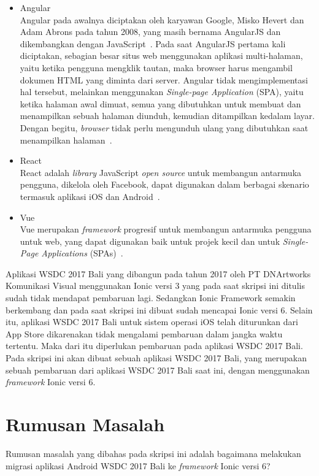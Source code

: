 \begin{itemize}
	\item Angular \\
	Angular pada awalnya diciptakan oleh karyawan Google, Misko Hevert dan Adam Abrons pada tahun 2008, yang masih bernama AngularJS dan dikembangkan dengan JavaScript~\cite{wohlgethan:18:supporting}. Pada saat AngularJS pertama kali diciptakan, sebagian besar situs web menggunakan aplikasi multi-halaman, yaitu ketika pengguna mengklik tautan, maka browser harus mengambil dokumen HTML yang diminta dari server. Angular tidak mengimplementasi hal tersebut, melainkan menggunakan \textit{Single-page Application} (SPA), yaitu ketika halaman awal dimuat, semua yang dibutuhkan untuk membuat dan menampilkan sebuah halaman diunduh, kemudian ditampilkan kedalam layar. Dengan begitu, \textit{browser} tidak perlu  mengunduh ulang yang dibutuhkan saat menampilkan halaman~\cite{scott:15:spa}.
	
	\item React \\
	React adalah \textit{library} JavaScript {\it open source} untuk membangun antarmuka pengguna, dikelola oleh Facebook, dapat digunakan dalam berbagai skenario termasuk aplikasi iOS dan Android~\cite{wohlgethan:18:supporting}.
	
	\item Vue \\
	 Vue merupakan \textit{framework} progresif untuk membangun antarmuka pengguna untuk web, yang dapat digunakan baik untuk projek kecil dan untuk {\it Single-Page Applications} (SPAs)~\cite{wohlgethan:18:supporting}.
\end{itemize}

Aplikasi WSDC 2017 Bali yang dibangun pada tahun 2017 oleh PT DNArtworks Komunikasi Visual menggunakan Ionic versi 3 yang pada saat skripsi ini ditulis sudah tidak mendapat pembaruan lagi. Sedangkan Ionic Framework semakin berkembang dan pada saat skripsi ini dibuat sudah mencapai Ionic versi 6. Selain itu, aplikasi WSDC 2017 Bali untuk sistem operasi iOS telah diturunkan dari App Store dikarenakan tidak mengalami pembaruan dalam jangka waktu tertentu. Maka dari itu diperlukan pembaruan pada aplikasi WSDC 2017 Bali. Pada skripsi ini akan dibuat sebuah aplikasi WSDC 2017 Bali, yang merupakan sebuah pembaruan dari aplikasi WSDC 2017 Bali saat ini, dengan menggunakan \textit{framework} Ionic versi 6.

\section{Rumusan Masalah}
\label{sec:rumusan}
Rumusan masalah yang dibahas pada skripsi ini adalah bagaimana melakukan migrasi aplikasi Android WSDC 2017 Bali ke {\it framework} Ionic versi 6?


